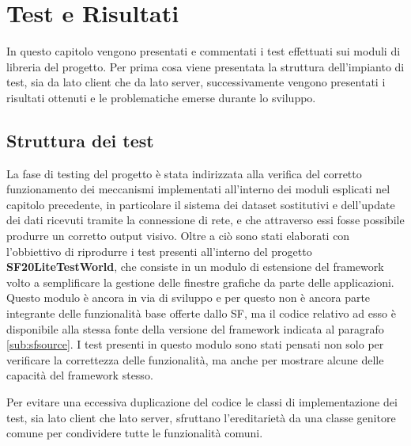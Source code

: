 
\chapter{Test e Risultati}
\label{ch:testerisultati}

In questo capitolo vengono presentati e commentati i test effettuati sui moduli di libreria del progetto. 
Per prima cosa viene presentata la struttura dell'impianto di test, sia da lato client che da lato server, successivamente vengono presentati i risultati ottenuti e le problematiche emerse durante lo sviluppo.


\section{Struttura dei test}
\label{sec:strutturatest}
La fase di testing del progetto \`e stata indirizzata alla verifica del corretto funzionamento dei meccanismi implementati all'interno dei moduli esplicati nel capitolo precedente, in particolare il sistema dei dataset sostitutivi e dell'update dei dati ricevuti tramite la connessione di rete, e che attraverso essi fosse possibile produrre un corretto output visivo. Oltre a ci\`o sono stati elaborati con l'obbiettivo di riprodurre i test presenti all'interno del progetto \textbf{SF20LiteTestWorld}, che consiste in un modulo di estensione del framework volto a semplificare la gestione delle finestre grafiche da parte delle applicazioni. Questo modulo \`e ancora in via di sviluppo e per questo non \`e ancora parte integrante delle funzionalit\`a base offerte dallo \ac{SF}, ma il codice relativo ad esso \`e disponibile alla stessa fonte della versione del framework indicata al paragrafo \ref{sub:sfsource}.
I test presenti in questo modulo sono stati pensati non solo per verificare la correttezza delle funzionalit\`a, ma anche per mostrare alcune delle capacit\`a del framework stesso.

Per evitare una eccessiva duplicazione del codice le classi di implementazione dei test, sia lato client che lato server, sfruttano l'ereditariet\`a da una classe genitore comune per condividere tutte le funzionalit\`a comuni.

